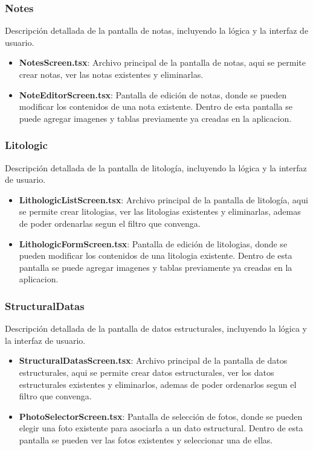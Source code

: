 \documentclass[a4paper,12pt]{article}
\begin{document}
\subsubsection{Notes}
Descripción detallada de la pantalla de notas, incluyendo la lógica y la interfaz de usuario.
\begin{itemize}
    \item \textbf{NotesScreen.tsx}: Archivo principal de la pantalla de notas, aqui se permite crear notas, ver las notas existentes y eliminarlas. 
    \item \textbf{NoteEditorScreen.tsx}: Pantalla de edición de notas, donde se pueden modificar los contenidos de una nota existente. Dentro de esta pantalla se puede agregar imagenes y tablas previamente ya creadas en la aplicacion.
\end{itemize}

\subsubsection{Litologic}
Descripción detallada de la pantalla de litología, incluyendo la lógica y la interfaz de usuario.
\begin{itemize}
    \item \textbf{LithologicListScreen.tsx}: Archivo principal de la pantalla de litología, aqui se permite crear litologias, ver las litologias existentes y eliminarlas, ademas de poder ordenarlas segun el filtro que convenga. 
    \item \textbf{LithologicFormScreen.tsx}: Pantalla de edición de litologias, donde se pueden modificar los contenidos de una litologia existente. Dentro de esta pantalla se puede agregar imagenes y tablas previamente ya creadas en la aplicacion.
\end{itemize}

\subsubsection{StructuralDatas}
Descripción detallada de la pantalla de datos estructurales, incluyendo la lógica y la interfaz de usuario.
\begin{itemize}
    \item \textbf{StructuralDatasScreen.tsx}: Archivo principal de la pantalla de datos estructurales, aqui se permite crear datos estructurales, ver los datos estructurales existentes y eliminarlos, ademas de poder ordenarlos segun el filtro que convenga.
    \item \textbf{PhotoSelectorScreen.tsx}: Pantalla de selección de fotos, donde se pueden elegir una foto existente para asociarla a un dato estructural. Dentro de esta pantalla se pueden ver las fotos existentes y seleccionar una de ellas.
\end{itemize}
\end{document}
